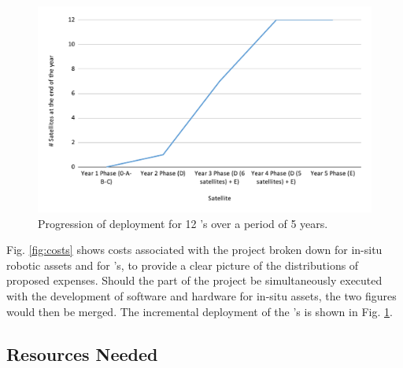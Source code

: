 \documentclass[12pt]{article}
\begin{document}
\begin{figure}
  \vspace{-1cm}
  \centering
  \includegraphics[scale=0.35]{fig/sat-progression.pdf}
  \caption{Progression of deployment for 12 \smle's over a period of 5
    years.}
  \label{fig:sat-prog}
  \vspace{-0.5cm}
\end{figure}

Fig. \ref{fig:costs} shows costs associated with the project broken
down for in-situ robotic assets and for \smle's, to provide a clear
picture of the distributions of proposed expenses. Should the \sml
part of the project be simultaneously executed with the development of
software and hardware for in-situ assets, the two figures would then
be merged. The incremental deployment of the \smle's is shown in
Fig. \ref{fig:sat-prog}. 


\subsection{Resources Needed}
\end{document}
